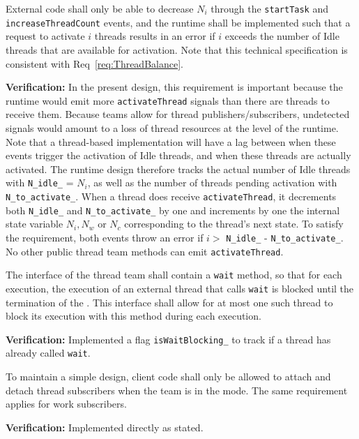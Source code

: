 \documentclass{article}
\begin{document}
\begin{spec}
External code shall only be able to decrease $N_i$ through the
\texttt{startTask} and \texttt{increaseThreadCount} events, and the runtime shall
be implemented such that a request to activate $i$ threads results in an error
if $i$ exceeds the number of Idle threads that are available for activation.
Note that this technical specification is consistent with
Req~\ref{req:ThreadBalance}.
\end{spec}
\textbf{Verification:}\hspace{0.125in}  In the present design, this requirement
is important because the runtime would emit more \texttt{activateThread} signals
than there are threads to receive them.  Because teams allow for thread
publishers/subscribers, undetected signals would amount to a loss of thread
resources at the level of the runtime.  Note that a thread-based implementation
will have a lag between when these events trigger the activation of Idle threads,
and when these threads are actually activated.  The runtime design therefore
tracks the actual number of Idle threads with \texttt{N\_idle\_} = $N_i$, as well
as the number of threads pending activation with \texttt{N\_to\_activate\_}.
When a thread does receive \texttt{activateThread}, it decrements both
\texttt{N\_idle\_} and \texttt{N\_to\_activate\_} by one and increments by one
the internal state variable $N_i, N_w$ or $N_c$ corresponding to the thread's
next state.  To satisfy the requirement, both events throw an error if $i > $
\texttt{N\_idle\_} - \texttt{N\_to\_activate\_}.  No other public thread team
methods can emit \texttt{activateThread}.

\begin{spec}
\label{spec:Runtime_OneWait}
The interface of the thread team shall contain a \texttt{wait} method, so that
for each \taskroutine execution, the execution of an external thread that calls
\texttt{wait} is blocked until the termination of the \taskroutine.  This interface
shall allow for at most one such thread to block its execution with this method
during each \taskroutine execution.
\end{spec}
\textbf{Verification:}\hspace{0.125in}  Implemented a flag
\texttt{isWaitBlocking\_} to track if a thread has already called \texttt{wait}.

\begin{spec}
To maintain a simple design, client code shall only be allowed to attach and
detach thread subscribers when the team is in the {\TeamIdle} mode.  The same
requirement applies for work subscribers.
\end{spec}
\textbf{Verification:}\hspace{0.125in} Implemented directly as stated.
\end{document}
